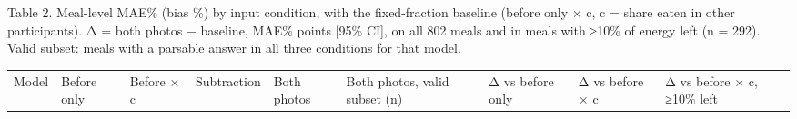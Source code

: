 \documentclass[
  11pt,
  letterpaper]{article}
\newcounter{none} %
\begin{document}
Table 2. Meal-level MAE\% (bias \%) by input condition, with the fixed-fraction baseline (before only × c, c =
share eaten in other participants). Δ = both photos − baseline, MAE\% points {[}95\% CI{]}, on all 802 meals
and in meals with ≥10\% of energy left (n = 292). Valid subset: meals with a parsable answer in all three
conditions for that model.

{\def\LTcaptype{none} %
\begin{longtable}[]{@{}
  >{\raggedright\arraybackslash}p{}
  >{\raggedright\arraybackslash}p{}
  >{\raggedright\arraybackslash}p{}
  >{\raggedright\arraybackslash}p{}
  >{\raggedright\arraybackslash}p{}
  >{\raggedright\arraybackslash}p{}
  >{\raggedright\arraybackslash}p{}
  >{\raggedright\arraybackslash}p{}
  >{\raggedright\arraybackslash}p{}@{}}
\toprule\noalign{}
\begin{minipage}[b]{\linewidth}\raggedright
Model
\end{minipage} & \begin{minipage}[b]{\linewidth}\raggedright
Before only
\end{minipage} & \begin{minipage}[b]{\linewidth}\raggedright
Before × c
\end{minipage} & \begin{minipage}[b]{\linewidth}\raggedright
Subtraction
\end{minipage} & \begin{minipage}[b]{\linewidth}\raggedright
Both photos
\end{minipage} & \begin{minipage}[b]{\linewidth}\raggedright
Both photos, valid subset (n)
\end{minipage} & \begin{minipage}[b]{\linewidth}\raggedright
Δ vs before only
\end{minipage} & \begin{minipage}[b]{\linewidth}\raggedright
Δ vs before × c
\end{minipage} & \begin{minipage}[b]{\linewidth}\raggedright
Δ vs before × c, ≥10\% left
\end{minipage} \\

\end{longtable}}
\end{document}
